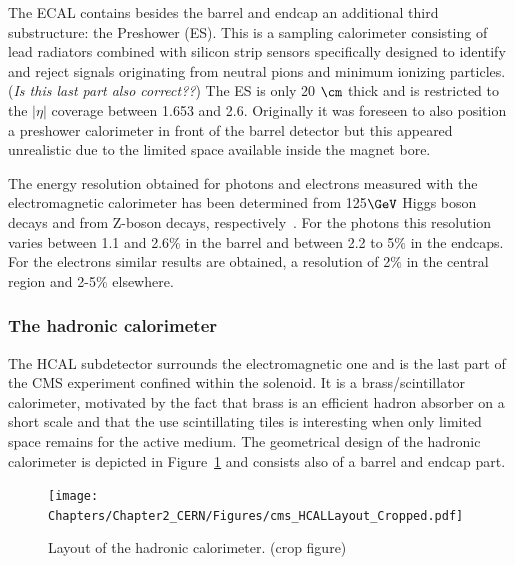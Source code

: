 The ECAL contains besides the barrel and endcap an additional third substructure: the Preshower (ES). This is a sampling calorimeter consisting of lead radiators combined with silicon strip sensors specifically designed to identify and reject signals originating from neutral pions and minimum ionizing particles. (\textit{Is this last part also correct??}) The ES is only 20 $\cm$ thick and is restricted to the $\vert \eta \vert$ coverage between 1.653 and 2.6. 
Originally it was foreseen to also position a preshower calorimeter in front of the barrel detector but this appeared unrealistic due to the limited space available inside the magnet bore.

The energy resolution obtained for photons and electrons measured with the electromagnetic calorimeter has been determined from 125$\GeV$ Higgs boson decays and from Z-boson decays, respectively~\cite{ECALResolution}. For the photons this resolution varies between 1.1 and 2.6$\%$ in the barrel and between 2.2 to 5$\%$ in the endcaps. 
For the electrons similar results are obtained, a resolution of 2$\%$ in the central region and 2-5$\%$ elsewhere.

\subsubsection{The hadronic calorimeter}
The HCAL subdetector surrounds the electromagnetic one and is the last part of the CMS experiment confined within the solenoid.
It is a brass/scintillator calorimeter, motivated by the fact that brass is an efficient hadron absorber on a short scale and that the use scintillating tiles is interesting when only limited space remains for the active medium. The geometrical design of the hadronic calorimeter is depicted in Figure~\ref{fig::HCAL} and consists also of a barrel and endcap part.
\begin{figure}[h!t]
 \centering
 \texttt{[image: Chapters/Chapter2\_CERN/Figures/cms\_HCALLayout\_Cropped.pdf]}
 \caption{Layout of the hadronic calorimeter. (crop figure)} \label{fig::HCAL}
\end{figure}

